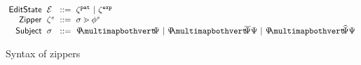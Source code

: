 \begin{figure}
  \vspace{-3px}
  \[
  \arraycolsep=3pt\begin{array}{rlrl}
      \mathsf{EditState} & \editState & ::= & \zip^{\pat} ~\vert~ \zip^{\expr} \\
      \mathsf{Zipper} & \zip^s & ::= & \zipper{\subject}{\tfrelem^s} \\
      \mathsf{Subject} & \subject & ::= &
        \pointing{\selection}{\selection} ~\vert~
        \selecting{\selection}{\selection}{\selection} ~\vert~
        \restructuring{\selection}{\selection}{\selection}
  \end{array}\]
  \caption{
    Syntax of zippers 
  }
  \label{fig:zipper-syntax}
\end{figure}
